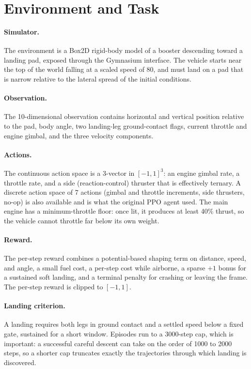 \documentclass[10pt,twocolumn]{article}
\begin{document}
\section{Environment and Task}

\paragraph{Simulator.} The environment is a Box2D rigid-body model of a booster descending toward a landing pad, exposed through the Gymnasium interface. The vehicle starts near the top of the world falling at a scaled speed of 80, and must land on a pad that is narrow relative to the lateral spread of the initial conditions.

\paragraph{Observation.} The 10-dimensional observation contains horizontal and vertical position relative to the pad, body angle, two landing-leg ground-contact flags, current throttle and engine gimbal, and the three velocity components.

\paragraph{Actions.} The continuous action space is a 3-vector in $[-1,1]^3$: an engine gimbal rate, a throttle rate, and a side (reaction-control) thruster that is effectively ternary. A discrete action space of 7 actions (gimbal and throttle increments, side thrusters, no-op) is also available and is what the original PPO agent used. The main engine has a minimum-throttle floor: once lit, it produces at least 40\% thrust, so the vehicle cannot throttle far below its own weight.

\paragraph{Reward.} The per-step reward combines a potential-based shaping term on distance, speed, and angle, a small fuel cost, a per-step cost while airborne, a sparse $+1$ bonus for a sustained soft landing, and a terminal penalty for crashing or leaving the frame. The per-step reward is clipped to $[-1,1]$.

\paragraph{Landing criterion.} A landing requires both legs in ground contact and a settled speed below a fixed gate, sustained for a short window. Episodes run to a 3000-step cap, which is important: a successful careful descent can take on the order of 1000 to 2000 steps, so a shorter cap truncates exactly the trajectories through which landing is discovered.
\end{document}
